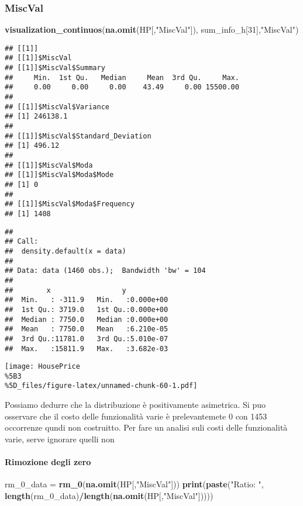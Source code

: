 \documentclass[
]{article}
\newenvironment{Shaded}{\begin{snugshade}}{\end{snugshade}}
\newcommand{\DecValTok}[1]{\textcolor[rgb]{0.00,0.00,0.81}{#1}}
\newcommand{\FunctionTok}[1]{\textcolor[rgb]{0.13,0.29,0.53}{\textbf{#1}}}
\newcommand{\NormalTok}[1]{#1}
\newcommand{\OtherTok}[1]{\textcolor[rgb]{0.56,0.35,0.01}{#1}}
\newcommand{\SpecialCharTok}[1]{\textcolor[rgb]{0.81,0.36,0.00}{\textbf{#1}}}
\newcommand{\StringTok}[1]{\textcolor[rgb]{0.31,0.60,0.02}{#1}}
\begin{document}
\subsubsection{MiscVal}\label{miscval}

\begin{Shaded}
\begin{Highlighting}[]
\FunctionTok{visualization\_continuos}\NormalTok{(}\FunctionTok{na.omit}\NormalTok{(HP[,}\StringTok{"MiscVal"}\NormalTok{]), sum\_info\_h[}\DecValTok{31}\NormalTok{],}\StringTok{"MiscVal"}\NormalTok{)}
\end{Highlighting}
\end{Shaded}

\begin{verbatim}
## [[1]]
## [[1]]$MiscVal
## [[1]]$MiscVal$Summary
##     Min.  1st Qu.   Median     Mean  3rd Qu.     Max. 
##     0.00     0.00     0.00    43.49     0.00 15500.00 
## 
## [[1]]$MiscVal$Variance
## [1] 246138.1
## 
## [[1]]$MiscVal$Standard_Deviation
## [1] 496.12
## 
## [[1]]$MiscVal$Moda
## [[1]]$MiscVal$Moda$Mode
## [1] 0
## 
## [[1]]$MiscVal$Moda$Frequency
## [1] 1408
\end{verbatim}

\begin{verbatim}
## 
## Call:
##  density.default(x = data)
## 
## Data: data (1460 obs.);  Bandwidth 'bw' = 104
## 
##        x                 y            
##  Min.   : -311.9   Min.   :0.000e+00  
##  1st Qu.: 3719.0   1st Qu.:0.000e+00  
##  Median : 7750.0   Median :0.000e+00  
##  Mean   : 7750.0   Mean   :6.210e-05  
##  3rd Qu.:11781.0   3rd Qu.:5.010e-07  
##  Max.   :15811.9   Max.   :3.682e-03
\end{verbatim}

\texttt{[image: HousePrice\\\%5B3\\\%5D\_files/figure-latex/unnamed-chunk-60-1.pdf]}

Possiamo dedurre che la distribuzione è positivamente asimetrica. Si puo
osservare che il costo delle funzionalità varie è prelevantemete 0 con
1453 occorrenze qundi non costruitto. Per fare un analisi suli costi
delle funzionalità varie, serve ignorare quelli non

\paragraph{Rimozione degli zero}\label{rimozione-degli-zero-14}

\begin{Shaded}
\begin{Highlighting}[]
\NormalTok{rm\_0\_data }\OtherTok{=} \FunctionTok{rm\_0}\NormalTok{(}\FunctionTok{na.omit}\NormalTok{(HP[,}\StringTok{"MiscVal"}\NormalTok{]))}
\FunctionTok{print}\NormalTok{(}\FunctionTok{paste}\NormalTok{(}\StringTok{"Ratio: "}\NormalTok{, }\FunctionTok{length}\NormalTok{(rm\_0\_data)}\SpecialCharTok{/}\FunctionTok{length}\NormalTok{(}\FunctionTok{na.omit}\NormalTok{(HP[,}\StringTok{"MiscVal"}\NormalTok{]))))}
\end{Highlighting}
\end{Shaded}
\end{document}
